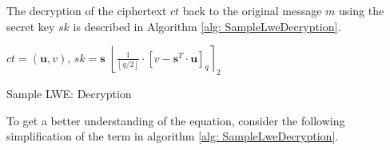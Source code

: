 The decryption of the ciphertext $ct$ back to the original message $m$ using the secret key $sk$ is described in Algorithm \ref{alg: SampleLweDecryption}.

\begin{algorithm}[htb]
  \begin{algorithmic}[1]
    \REQUIRE $ct = (\textbf{u}, v)$, $sk = \textbf{s}$
    \RETURN $\left\lfloor \frac{1}{\left\lfloor q/2\right\rfloor}\cdot \left[v-\textbf{s}^T \cdot \textbf{u}\right]_q\right\rceil _2$
  \end{algorithmic}
  \caption{Sample LWE: Decryption}
  \label{alg: SampleLweDecryption}
\end{algorithm}


To get a better understanding of the equation, consider the following simplification of the term in algorithm \ref{alg: SampleLweDecryption}.

